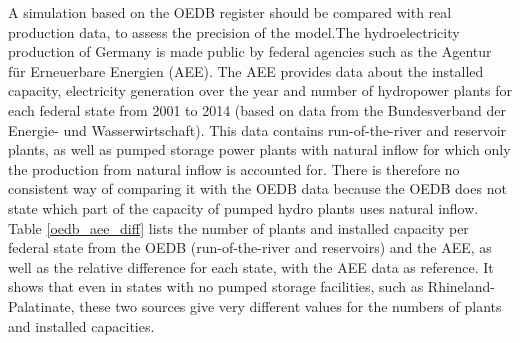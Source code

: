 A simulation based on the OEDB register should be compared with real production data, to assess the precision of the model.\newline The hydroelectricity production of Germany is made public by federal agencies such as the Agentur für Erneuerbare Energien (AEE). The AEE provides data about the installed capacity, electricity generation over the year and number of hydropower plants for each federal state \cite{aee} from 2001 to 2014 (based on data from the Bundesverband der Energie- und Wasserwirtschaft). This data contains run-of-the-river and reservoir plants, as well as pumped storage power plants with natural inflow for which only the production from natural inflow is accounted for. There is therefore no consistent way of comparing it with the OEDB data because the OEDB does not state which part of the capacity of pumped hydro plants uses natural inflow. \newline
Table \ref{oedb_aee_diff} lists the number of plants and installed capacity per federal state from the OEDB (run-of-the-river and reservoirs) and the AEE, as well as the relative difference for each state, with the AEE data as reference. It shows that even in states with no pumped storage facilities, such as Rhineland-Palatinate, these two sources give very different values for the numbers of plants and installed capacities.

